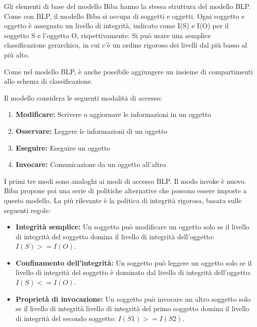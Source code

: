 \singlespacing

Gli elementi di base del modello Biba hanno la stessa struttura del modello BLP. Come con BLP, il modello Biba si occupa di soggetti e oggetti. Ogni soggetto e oggetto è assegnato un livello di integrità, indicato come I(S) e I(O) per il soggetto S e l'oggetto O, rispettivamente. Si può usare una semplice classificazione gerarchica, in cui c'è un ordine rigoroso dei livelli dal più basso al più alto.

\singlespacing

Come nel modello BLP, è anche possibile aggiungere un insieme di compartimenti allo schema di classificazione. 

\singlespacing

Il modello considera le seguenti modalità di accesso:

\begin{enumerate}
    \item \textbf{Modificare:} Scrivere o aggiornare le informazioni in un oggetto
    
    \item \textbf{Osservare:} Leggere le informazioni di un oggetto
    
    \item \textbf{Eseguire:} Eseguire un oggetto
    
    \item \textbf{Invocare:} Comunicazione da un oggetto all'altro
\end{enumerate}
I primi tre modi sono analoghi ai modi di accesso BLP. Il modo invoke è nuovo. Biba propone poi una serie di politiche alternative che possono essere imposte a questo modello. La più rilevante è la politica di integrità rigorosa, basata sulle seguenti regole:

\begin{itemize}
    \item \textbf{Integrità semplice:} Un soggetto può modificare un oggetto solo se il livello di integrità del soggetto domina il livello di integrità dell'oggetto: $I(S) >= I(O)$.
    
    \item \textbf{Confinamento dell'integrità:} Un soggetto può leggere un oggetto solo se il livello di integrità del soggetto è dominato dal livello di integrità dell'oggetto: $I(S) <= I(O)$.
    
    \item \textbf{Proprietà di invocazione:} Un soggetto può invocare un altro soggetto solo se il livello di integrità livello di integrità del primo soggetto domina il livello di integrità del secondo soggetto: $I(S1) >= I(S2)$.

\end{itemize}

